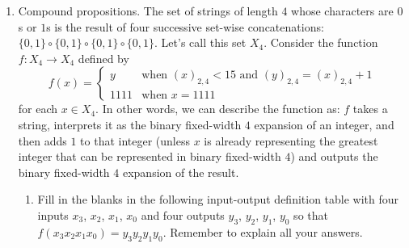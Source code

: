 \begin{enumerate}[labelindent=0pt, leftmargin=0pt]
    \item Compound propositions. The set of strings of length $4$ whose characters are $0$s or $1$s is
        the result of four successive set-wise concatenations: $\{0,1\} \circ \{0,1\} \circ \{0,1\}\circ \{0,1\}$. Let's call
        this set $X_4$. Consider the function $f: X_4 \to X_4$ defined by
        $$ f(x) = 
        \begin{cases} 
            y &\text{when $(x)_{2,4} < 15$ and $(y)_{2,4} = (x)_{2,4} + 1$}\\
            1111 &\text{when $x = 1111$}
        \end{cases}$$
        for each $x \in X_4$. In other words, we can describe the function as: $f$ takes a string, interprets it as the binary fixed-width $4$
        expansion of an integer, and then adds $1$ to that integer (unless $x$ is already representing
        the greatest integer that can be represented in binary fixed-width $4$) and outputs the binary 
        fixed-width $4$ expansion of the result.
        \begin{enumerate} 
        \item Fill in the blanks in the following input-output definition table 
        with four inputs $x_3$, $x_2$, $x_1$, $x_0$ and four outputs $y_3$, $y_2$, $y_1$, $y_0$
        so that $f(x_3x_2x_1x_0) = y_3y_2y_1y_0$. Remember to explain all your answers.
        

\end{enumerate}
\end{enumerate}

